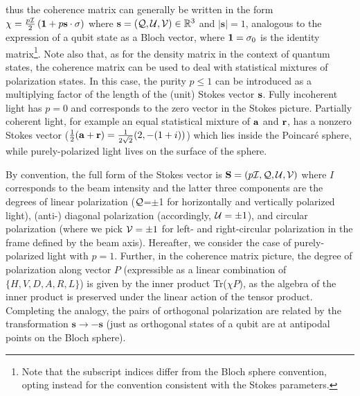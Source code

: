 	thus the coherence matrix can generally be written in the form $\chi = \frac{p\mathcal{I}}{2}\left(\mathbf{1} + p\mathbf{s}\cdot\mathbf{\sigma}\right)$ where $\mathbf{s}=(\mathcal{Q},\mathcal{U},\mathcal{V})\in\mathbb{R}^3$ and $|\mathbf{s}|=1$, analogous to the expression of a qubit state as a Bloch vector, where $\mathbf{1}=\sigma_0$ is the identity matrix\footnote{Note that the subscript indices differ from the Bloch sphere convention, opting instead for the convention consistent with the Stokes parameters.}.
	Note also that, as for the density matrix in the context of quantum states, the coherence matrix can be used to deal with statistical mixtures of polarization states. In this case, the purity $p\leq1$ can be introduced as a multiplying factor of the length of the (unit) Stokes vector $\mathbf{s}$. Fully incoherent light has $p=0$ and corresponds to the zero vector in the Stokes picture. Partially coherent light, for example an equal statistical mixture of $\mathbf{a}$ and $\mathbf{r}$, has a nonzero Stokes vector ($\frac{1}{2}(\mathbf{a}+\mathbf{r})=\frac{1}{2\sqrt{2}}(2,-(1+i))$) which lies inside the Poincar\'{e} sphere, while purely-polarized light lives on the surface of the sphere.
	
	By convention, the full form of the Stokes vector is $\mathbf{S} = (p\mathcal{I},\mathcal{Q},\mathcal{U},\mathcal{V})$ where $I$ corresponds to the beam intensity and the latter three components are the degrees of linear polarization ($\mathcal{Q}$=$\pm$1 for horizontally and vertically polarized light), (anti-) diagonal polarization (accordingly, $\mathcal{U}=\pm1$), and circular polarization (where we pick $\mathcal{V}=\pm1$ for left- and right-circular polarization in the frame defined by the beam axis). Hereafter, we consider the case of purely-polarized light with $p=1$.
	Further, in the coherence matrix picture, the degree of polarization along vector $P$ (expressible as a linear combination of $\{H,V,D,A,R,L\}$) is given by the inner product Tr($\chi P$), as the algebra of the inner product is preserved under the linear action of the tensor product. 
	Completing the analogy, the pairs of orthogonal polarization are related by the transformation $\mathbf{s}\rightarrow-\mathbf{s}$ (just as orthogonal states of a qubit are at antipodal points on the Bloch sphere).
	
